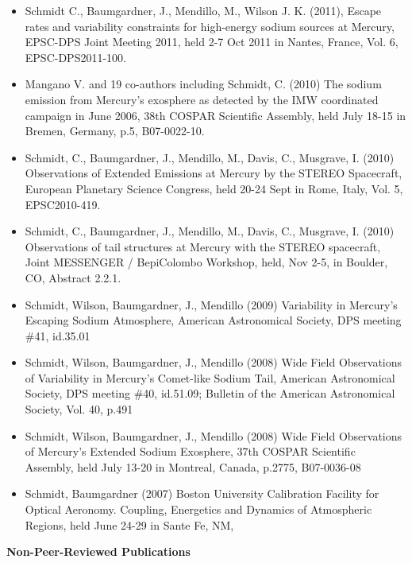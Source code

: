 \documentclass[12pt]{report}
\begin{document}
\begin{itemize}
   \item Schmidt C., Baumgardner, J., Mendillo, M., Wilson J. K. (2011), Escape rates and variability constraints for high-energy sodium sources at Mercury, EPSC-DPS Joint Meeting 2011, held 2-7 Oct 2011 in Nantes, France, Vol. 6, EPSC-DPS2011-100.
   \item Mangano V. and 19 co-authors including Schmidt, C. (2010) The sodium emission from Mercury's exosphere as detected by the IMW coordinated campaign in June 2006, 38th COSPAR Scientific Assembly, held July 18-15 in Bremen, Germany, p.5, B07-0022-10. 
   \item Schmidt, C., Baumgardner, J., Mendillo, M., Davis, C., Musgrave, I. (2010) Observations of Extended Emissions at Mercury by the STEREO Spacecraft, European Planetary Science Congress, held 20-24 Sept in Rome, Italy, Vol. 5, EPSC2010-419.
   \item Schmidt, C., Baumgardner, J., Mendillo, M., Davis, C., Musgrave, I. (2010) Observations of tail structures at Mercury with the STEREO spacecraft, Joint MESSENGER / BepiColombo Workshop, held, Nov 2-5, in Boulder, CO, Abstract 2.2.1. 
   \item Schmidt, Wilson, Baumgardner, J., Mendillo (2009) Variability in Mercury's Escaping Sodium Atmosphere, American Astronomical Society, DPS meeting \#41, id.35.01
   \item Schmidt, Wilson, Baumgardner, J., Mendillo (2008) Wide Field Observations of Variability in Mercury's Comet-like Sodium Tail, American Astronomical Society, DPS meeting \#40, id.51.09; Bulletin of the American Astronomical Society, Vol. 40, p.491
   \item Schmidt, Wilson, Baumgardner, J., Mendillo (2008) Wide Field Observations of Mercury's Extended Sodium Exosphere, 37th COSPAR Scientific Assembly, held July 13-20 in Montreal, Canada, p.2775, B07-0036-08
   \item Schmidt, Baumgardner (2007) Boston University Calibration Facility for Optical Aeronomy. Coupling, Energetics and Dynamics of Atmospheric Regions, held June 24-29 in Sante Fe, NM,
  \end{itemize}
\vspace{2 mm}
\noindent\bf{Non-Peer-Reviewed Publications}\rm \hspace*{\fill} \\
\end{document}

